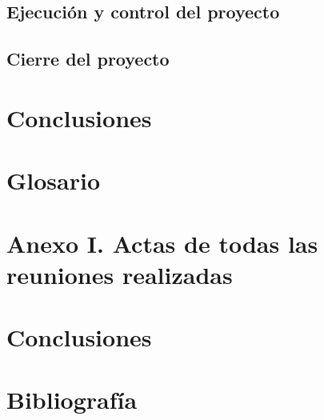 \documentclass{article}
\begin{document}
\subsection{Ejecución y control del proyecto}

\subsection{Cierre del proyecto}

\section{Conclusiones}

\section*{Glosario}

\section*{Anexo I. Actas de todas las reuniones realizadas}

\section{Conclusiones}

\section{Bibliografía}
\end{document}
